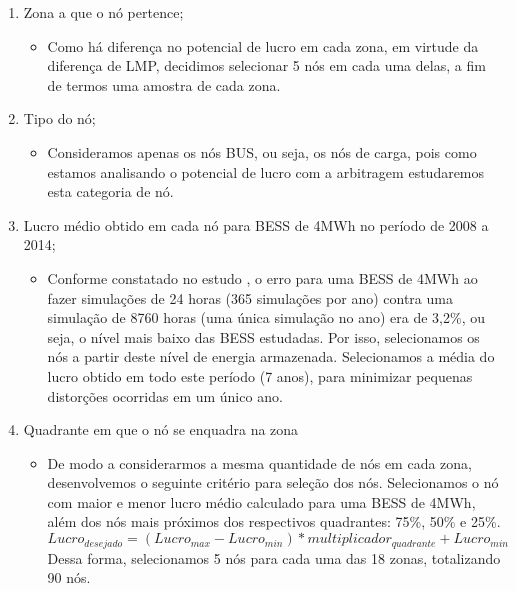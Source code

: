 \begin{enumerate}
    \item Zona a que o nó pertence;
    \begin{itemize}
        \item Como há diferença no potencial de lucro em cada zona, em virtude da diferença de \ac{LMP}, decidimos selecionar 5 nós em cada uma delas, a fim de termos uma amostra de cada zona.
        \end{itemize}
    \item Tipo do nó;
        \begin{itemize}
            \item Consideramos apenas os nós BUS, ou seja, os nós de carga, pois como estamos analisando o potencial de lucro com a arbitragem estudaremos esta categoria de nó.
        \end{itemize}
    \item Lucro médio obtido em cada nó para \ac{BESS} de 4MWh no período de 2008 a 2014;
        \begin{itemize}
            \item Conforme constatado no estudo \cite{salles2017}, o erro para uma \ac{BESS} de 4MWh ao fazer simulações de 24 horas (365 simulações por ano) contra uma simulação de 8760 horas (uma única simulação no ano) era de 3,2\%, ou seja, o nível mais baixo das \ac{BESS} estudadas. Por isso, selecionamos os nós a partir deste nível de energia armazenada. Selecionamos a média do lucro obtido em todo este período (7 anos), para minimizar pequenas distorções ocorridas em um único ano. 
        \end{itemize}
    \item Quadrante em que o nó se enquadra na zona
        \begin{itemize}
            \item De modo a considerarmos a mesma quantidade de nós em cada zona, desenvolvemos o seguinte critério para seleção dos nós. Selecionamos o nó com maior e menor lucro médio calculado para uma \ac{BESS} de 4MWh, além dos nós mais próximos dos respectivos quadrantes: 75\%, 50\% e 25\%. 
            \begin{equation}
                Lucro_{desejado} = (Lucro_{max}  -  Lucro_{min}) *  multiplicador_{quadrante} +  Lucro_{min}
            \end{equation}
            Dessa forma, selecionamos 5 nós para cada uma das 18 zonas, totalizando 90 nós.
        \end{itemize}
\end{enumerate}


